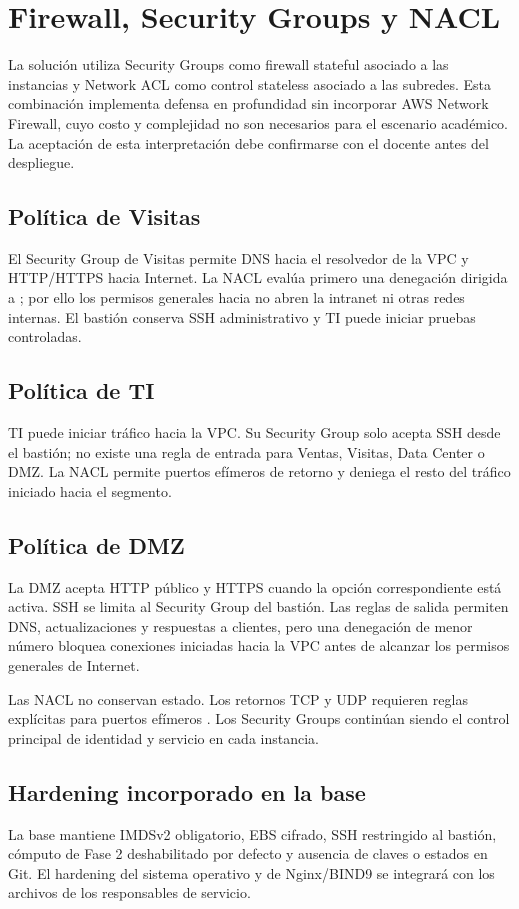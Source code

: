 \chapter{Firewall, Security Groups y NACL}

La solución utiliza Security Groups como firewall stateful asociado a las instancias y Network
ACL como control stateless asociado a las subredes. Esta combinación implementa defensa en
profundidad sin incorporar AWS Network Firewall, cuyo costo y complejidad no son necesarios
para el escenario académico. La aceptación de esta interpretación debe confirmarse con el
docente antes del despliegue.

\section{Política de Visitas}

El Security Group de Visitas permite DNS hacia el resolvedor de la VPC y HTTP/HTTPS hacia
Internet. La NACL evalúa primero una denegación dirigida a ; por ello los
permisos generales hacia  no abren la intranet ni otras redes internas. El
bastión conserva SSH administrativo y TI puede iniciar pruebas controladas.

\section{Política de TI}

TI puede iniciar tráfico hacia la VPC. Su Security Group solo acepta SSH desde el bastión; no
existe una regla de entrada para Ventas, Visitas, Data Center o DMZ. La NACL permite puertos
efímeros de retorno y deniega el resto del tráfico iniciado hacia el segmento.

\section{Política de DMZ}

La DMZ acepta HTTP público y HTTPS cuando la opción correspondiente está activa. SSH se
limita al Security Group del bastión. Las reglas de salida permiten DNS, actualizaciones y
respuestas a clientes, pero una denegación de menor número bloquea conexiones iniciadas hacia
la VPC antes de alcanzar los permisos generales de Internet.

\begin{warningbox}
Las NACL no conservan estado. Los retornos TCP y UDP requieren reglas explícitas para puertos
efímeros . Los Security Groups continúan siendo el control principal de
identidad y servicio en cada instancia.
\end{warningbox}

\section{Hardening incorporado en la base}

La base mantiene IMDSv2 obligatorio, EBS cifrado, SSH restringido al bastión, cómputo de Fase
2 deshabilitado por defecto y ausencia de claves o estados en Git. El hardening del sistema
operativo y de Nginx/BIND9 se integrará con los archivos de los responsables de servicio.
